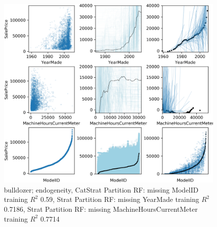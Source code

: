 \documentclass[12pt]{article}
\begin{document}
\begin{figure}[htbp]
\begin{center}
\includegraphics[scale=0.7]{images/bulldozer.png}
\caption{bulldozer; endogeneity, CatStrat Partition RF: missing ModelID training $R^2$ 0.59, Strat Partition RF: missing YearMade training $R^2$ 0.7186, Strat Partition RF: missing MachineHoursCurrentMeter training $R^2$ 0.7714}
\label{fig:bulldozer}
\end{center}
\end{figure}
\end{document}
